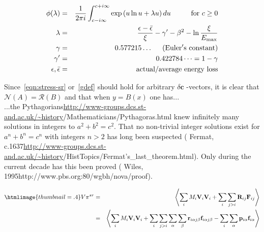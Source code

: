 \documentclass[a4paper,twoside]{article}
\providecommand{\Range}{\mathcal{R}}\providecommand{\Ker}{\mathcal{N}}
\newcommand{\StAndrews}{\url{http://www-groups.dcs.st-and.ac.uk/~history}}%
\newcommand{\Pythagorians}{\htmladdnormallink
 {Pythagorians}{\StAndrews/Mathematicians/Pythagoras.html}}
\newcommand{\Fermat}{\htmladdnormallink
 {Fermat, c.1637}{\StAndrews/HistTopics/Fermat's_last_theorem.html}}
\newcommand{\Wiles}{\htmladdnormallink
 {Wiles, 1995}{http://www.pbs.org:80/wgbh/nova/proof}}
\begin{document}
\begin{flushright}
\begin{makeimage}
\begin{eqnarray}
 \phi(\lambda) & = &  \frac{1} {2 \pi i}\int^{c+i\infty}_{c-i\infty}
  \exp \left( u \ln u + \lambda u \right ) du \hspace{1cm}\mbox{for } c \geq 0 \\
 \lambda       & = &  \frac{\epsilon  -\bar{\epsilon} }{\xi}
                   - \gamma' - \beta^2 - \ln \frac{\xi} {E_{\rm max}}          \\
 \gamma        & = &  0.577215\dots \mathrm{\hspace{5mm}(Euler's\ constant)}   \\
 \gamma'       & = &  0.422784\dots = 1 - \gamma                               \\
   \epsilon , \bar{\epsilon} & = & \mbox{actual/average energy loss}
\end{eqnarray}
\end{makeimage}
\end{flushright}

Since~\eqref{eqn:stress-sr} or~\eqref{gdef} should hold for arbitrary $\delta\bm{c}$%
-vectors, it is clear that $\Ker(A) = \Range(B)$ and that when $y=B(x)$ one has...\\
...the \Pythagorians{} knew infinitely many solutions in integers to $a^2+b^2=c^2$. 
That no non-trivial integer solutions exist for $a^n+b^n=c^n$ with integers $n>2$ has long 
been suspected (\Fermat). Only during the current decade has this been proved (\Wiles).

\begin{flushright}
\begin{eqnarray}\htmlimage{thumbnail=.4}
\label{eqn:stress-sr}
 V \bm{\pi}^{sr} & = & \left<  \sum_i M_i \bm{V}_i \bm{V}_i
  + \sum_i \sum_{j>i} \bm{R}_{ij} \bm{F}_{ij}\right> \\ \nonumber
                 & = & \left< \sum_i M_i \bm{V}_i \bm{V}_i
  + \sum_{i}\sum_{j>i}\sum_\alpha\sum_\beta \bm{r}_{i\alpha j\beta}\bm{f}_{i\alpha j\beta}
  - \sum_i \sum_\alpha \bm{p}_{i\alpha} \bm{f}_{i\alpha}   \right>
\end{eqnarray}
\end{flushright}
\end{document}
